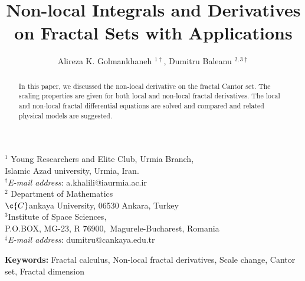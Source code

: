 \documentclass[12pt]{article}
\begin{document}
\title{ Non-local Integrals and Derivatives on Fractal Sets with Applications}

\author{  Alireza K. Golmankhaneh $^{1\dag}$, Dumitru Baleanu  $^{2,3 \ddag}$ }

\maketitle \vspace{-9mm}

\begin{center}
$^1$ Young Researchers and Elite Club, Urmia Branch,\\ Islamic Azad university, Urmia, Iran.\\
\emph{$^\dag$E-mail address}: a.khalili@iaurmia.ac.ir\\

$^2$ Department of Mathematics \\
$\c{C}$ankaya University, 06530 Ankara, Turkey\\
$^3$Institute of Space
Sciences,\\
 P.O.BOX, MG-23, R 76900,~Magurele-Bucharest, Romania\\

\emph{$^\ddag$E-mail address}: dumitru@cankaya.edu.tr
\end{center}
\date{}
\maketitle \vspace{-9mm}
\begin{abstract}
In this paper, we discussed the non-local derivative on the fractal Cantor set. The scaling properties are given for  both local and non-local fractal derivatives. The local and non-local fractal diﬀerential equations are solved and compared and related physical models are suggested.
\end{abstract}
\textbf{Keywords:} Fractal calculus, Non-local fractal derivatives, Scale change, Cantor set, Fractal dimension
\end{document}

